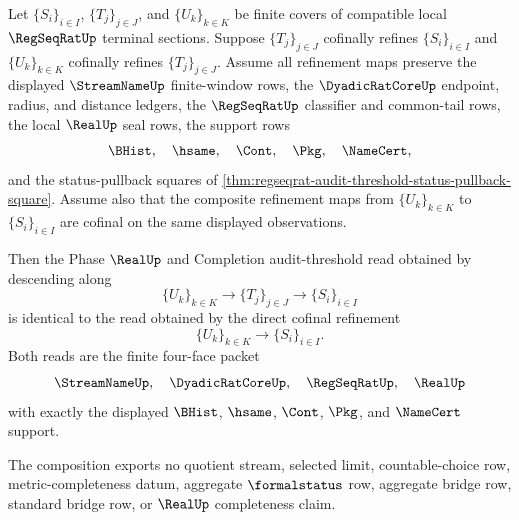 \begin{theorem}
\label{thm:regseqrat-audit-threshold-refinement-composition}
Let $\{S_i\}_{i \in I}$, $\{T_j\}_{j \in J}$, and $\{U_k\}_{k \in K}$ be finite covers of compatible local $\RegSeqRatUp$ terminal sections. Suppose $\{T_j\}_{j \in J}$ cofinally refines $\{S_i\}_{i \in I}$ and $\{U_k\}_{k \in K}$ cofinally refines $\{T_j\}_{j \in J}$. Assume all refinement maps preserve the displayed $\StreamNameUp$ finite-window rows, the $\DyadicRatCoreUp$ endpoint, radius, and distance ledgers, the $\RegSeqRatUp$ classifier and common-tail rows, the local $\RealUp$ seal rows, the support rows
$$
\BHist,\quad \hsame,\quad \Cont,\quad \Pkg,\quad \NameCert,
$$
and the status-pullback squares of \autoref{thm:regseqrat-audit-threshold-status-pullback-square}. Assume also that the composite refinement maps from $\{U_k\}_{k \in K}$ to $\{S_i\}_{i \in I}$ are cofinal on the same displayed observations.

Then the Phase $\RealUp$ and Completion audit-threshold read obtained by descending along
$$
\{U_k\}_{k \in K} \longrightarrow \{T_j\}_{j \in J} \longrightarrow \{S_i\}_{i \in I}
$$
is identical to the read obtained by the direct cofinal refinement
$$
\{U_k\}_{k \in K} \longrightarrow \{S_i\}_{i \in I}.
$$
Both reads are the finite four-face packet
$$
\StreamNameUp,\quad \DyadicRatCoreUp,\quad \RegSeqRatUp,\quad \RealUp
$$
with exactly the displayed $\BHist$, $\hsame$, $\Cont$, $\Pkg$, and $\NameCert$ support.

The composition exports no quotient stream, selected limit, countable-choice row, metric-completeness datum, aggregate $\formalstatus$ row, aggregate bridge row, standard bridge row, or $\RealUp$ completeness claim.
\end{theorem}
